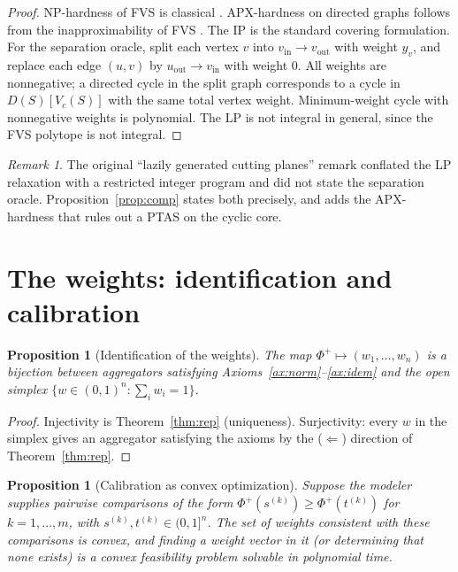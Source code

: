 \documentclass[11pt]{article}
\newtheorem{proposition}[theorem]{Proposition}
\theoremstyle{definition}
\theoremstyle{remark}
\newtheorem{remark}[theorem]{Remark}
\newcommand{\Ph}{\Phi^{+}}
\begin{document}
\begin{proof}
NP-hardness of FVS is classical \cite{Karp1972}. APX-hardness on directed graphs follows from the inapproximability of FVS \cite{DinurGuruswamiKhotRegev2003}. The IP is the standard covering formulation. For the separation oracle, split each vertex $v$ into $v_{\mathrm{in}}\to v_{\mathrm{out}}$ with weight $y_v$, and replace each edge $(u,v)$ by $u_{\mathrm{out}}\to v_{\mathrm{in}}$ with weight $0$. All weights are nonnegative; a directed cycle in the split graph corresponds to a cycle in $D(S)[V_c(S)]$ with the same total vertex weight. Minimum-weight cycle with nonnegative weights is polynomial. The LP is not integral in general, since the FVS polytope is not integral.
\end{proof}

\begin{remark}
The original ``lazily generated cutting planes'' remark conflated the LP relaxation with a restricted integer program and did not state the separation oracle. Proposition~\ref{prop:comp} states both precisely, and adds the APX-hardness that rules out a PTAS on the cyclic core.
\end{remark}

\section{The weights: identification and calibration}\label{sec:calib}

\begin{proposition}[Identification of the weights]\label{prop:ident}
The map $\Ph\mapsto(w_1,\dots,w_n)$ is a bijection between aggregators satisfying Axioms~\ref{ax:norm}--\ref{ax:idem} and the open simplex $\{w\in(0,1)^n:\sum_i w_i=1\}$.
\end{proposition}

\begin{proof}
Injectivity is Theorem~\ref{thm:rep} (uniqueness). Surjectivity: every $w$ in the simplex gives an aggregator satisfying the axioms by the ($\Leftarrow$) direction of Theorem~\ref{thm:rep}.
\end{proof}

\begin{proposition}[Calibration as convex optimization]\label{prop:calib}
Suppose the modeler supplies pairwise comparisons of the form $\Ph(s^{(k)})\ge \Ph(t^{(k)})$ for $k=1,\dots,m$, with $s^{(k)},t^{(k)}\in(0,1]^n$. The set of weights consistent with these comparisons is convex, and finding a weight vector in it (or determining that none exists) is a convex feasibility problem solvable in polynomial time.
\end{proposition}
\end{document}
